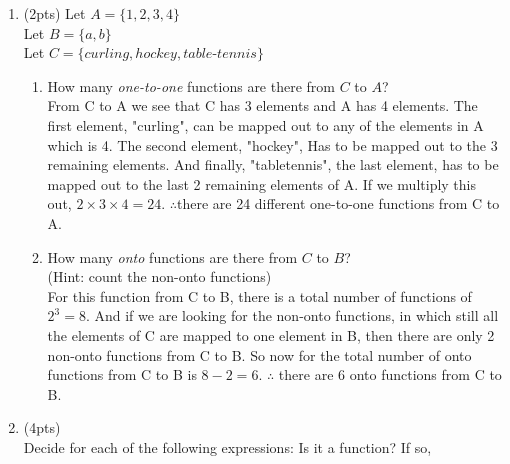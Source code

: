 \documentclass[12pt]{article}
\begin{document}
\begin{enumerate}
\item  (2pts)
Let \(A = \lbrace{1,2,3,4}\rbrace\) \\
Let \(B = \lbrace{a,b}\rbrace\) \\
Let \(C = \lbrace{curling,hockey,table\text{-}tennis}\rbrace\)
\begin{enumerate}
\item  How many {\it  one-to-one } functions are there from \(C\) to \(A\)?
\\From C to A we see that C has 3 elements and A has 4 elements. The first element, "curling", can be mapped out to any of the elements in A which is 4. The second element, "hockey", Has to be mapped out to the 3 remaining elements. And finally, "table\text{-}tennis", the last element, has to be mapped out to the last 2 remaining elements of A. If we multiply this out, $2 \times 3 \times 4 = 24$. $\therefore$there are 24 different one-to-one functions from C to A.
\item  How many {\it  onto }   functions are there from \(C\) to \(B\)?\\
(Hint: count the non-onto functions)
\\For this function from C to B, there is a total number of functions of $2^3=8$. And if we are looking for the non-onto functions, in which still all the elements of C are mapped to one element in B, then there are only 2 non-onto functions from C to B. So now for the total number of onto functions from C to B is $8 - 2 = 6$. $\therefore$ there are 6 onto functions from C to B.
\\
\end{enumerate}

\item  (4pts) \\Decide for each of the following expressions: Is it a function? If so,


\end{enumerate}
\end{document}
